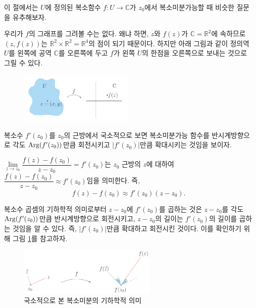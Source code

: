 이 절에서는 $U$에 정의된 복소함수 $f:U \to \mathbb C$가
$z_0$에서 복소미분가능할 때 비슷한 질문을 유추해보자.
\begin{center}
\end{center}

우리가 $f$의 그래프를 그려볼 수는 없다.
왜냐 하면, $z$와 $f(z)$가 $\mathbb C = \mathbb R^2$에 속하므로
$(z, f(z))$는 $\mathbb R^2 \times \mathbb R^2 = \mathbb R^4$의 점이 되기 때문이다.
하지만 아래 그림과 같이
정의역 $U$를 왼쪽에 공역 $\mathbb C$를 오른쪽에 두고
$f$가 왼쪽 $U$의 한점을 오른쪽으로 보내는 것으로 그릴 수 있다.

\begin{figure}[!h]
\begin{center}
\includegraphics[width=0.5\textwidth]{./SaltChapter/figs/fig-2-0-4}
\end{center}
\end{figure}

복소수 $f'(z_0)$를 
$z_0$의 근방에서 국소적으로 보면 
복소미분가능 함수를 반시계방향으로 각도 $\mathop{\mathrm{Arg}}(f'(z_0))$만큼 회전시키고
$|f'(z_0)|$만큼 확대시키는 것임을 보이자.

$\lim\limits_{z\to z_0} \dfrac{f(z) - f(z_0)}{z-z_0} = f'(z_0)$는
$z_0$ 근방의 $z$에 대하여
$\dfrac{f(z) - f(z_0)}{z-z_0} \approx f'(z_0)$임을 의미한다. 즉,
\[
f(z) - f(z_0) \approx f'(z_0)(z-z_0).
\]

복소수 곱셈의 기하학적 의미로부터
$z-z_0$에 $f'(z_0)$를 곱하는 것은
$z-z_0$를 각도 $\mathop{\mathrm{Arg}}(f'(z_0))$만큼 반시계방향으로 회전시키고,
$z-z_0$의 길이는  $f'(z_0)$의 길이를 곱하는 것임을 알 수 있다. 
즉, $|f'(z_0)|$만큼 확대하고 회전시킨 것이다.
이를 확인하기 위해 그림 \ref{fig-2-9}를 참고하자.

\begin{figure}[!h]
\begin{center}
\includegraphics[width=0.6\textwidth]{./SaltChapter/figs/fig-2-9}
\end{center}
\caption{국소적으로 본 복소미분의 기하학적 의미}
\label{fig-2-9}
\end{figure}

